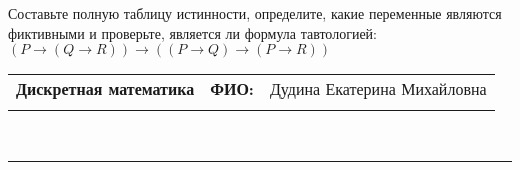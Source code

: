 \documentclass[10pt]{exam}
\newcommand{\class}{Дискретная математика}
\newcommand{\examdate}{}
\begin{document}
\begin{questions}
\begin{enumerate}[a)]
\end{enumerate}\question Составьте полную таблицу истинности, определите, какие переменные являются фиктивными и проверьте, является ли формула тавтологией:
$(P \rightarrow (Q \rightarrow R)) \rightarrow ((P \rightarrow Q) \rightarrow (P \rightarrow R))$

\end{questions}
\newpage
\begin{flushright}
\begin{tabular}{p{2.8in} r l}
\textbf{\class} & \textbf{ФИО:} &Дудина Екатерина Михайловна
\\

\textbf{\examdate} &&\\
\end{tabular}\\
\end{flushright}
\rule[1ex]{\textwidth}{.1pt}
\end{document}
